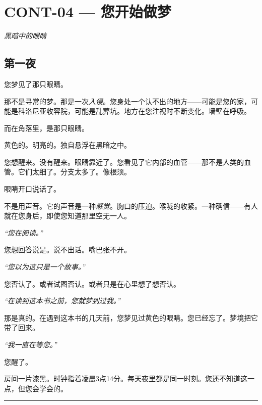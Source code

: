 \section*{\textbf{CONT-04} --- 您开始做梦}

\noindent \textit{黑暗中的眼睛}

\subsection*{第一夜}

\noindent 您梦见了那只眼睛。

\noindent 那不是寻常的梦。那是一次\textit{入侵}。您身处一个认不出的地方——可能是您的家，可能是科洛尼亚收容院，可能是乱葬坑。地方在您注视时不断变化。墙壁在呼吸。

\noindent 而在角落里，是那只眼睛。

\noindent 黄色的。明亮的。独自悬浮在黑暗之中。

\noindent 您想醒来。没有醒来。眼睛靠近了。您看见了它内部的血管——那不是人类的血管。它们太细了。分支太多了。像根须。

\noindent 眼睛开口说话了。

\noindent 不是用声音。它的声音是一种\textit{感觉}。胸口的压迫。喉咙的收紧。一种确信——有人就在您身后，即使您知道那里空无一人。

\noindent \textit{\textquotedblleft{}您在阅读。\textquotedblright{}}

\noindent 您想回答说是。说不出话。嘴巴张不开。

\noindent \textit{\textquotedblleft{}您以为这只是一个故事。\textquotedblright{}}

\noindent 您否认了。或者试图否认。或者只是在心里想了想否认。

\noindent \textit{\textquotedblleft{}在读到这本书之前，您就梦到过我。\textquotedblright{}}

\noindent 那是真的。在遇到这本书的几天前，您梦见过黄色的眼睛。您已经忘了。梦境把它带了回来。

\noindent \textit{\textquotedblleft{}我一直在等您。\textquotedblright{}}

\noindent 您醒了。

\noindent 房间一片漆黑。时钟指着凌晨3点14分。每天夜里都是同一时刻。您还不知道这一点，但您会学会的。

\vspace{0.5em}\noindent\rule{\textwidth}{0.5pt}\vspace{0.5em}

